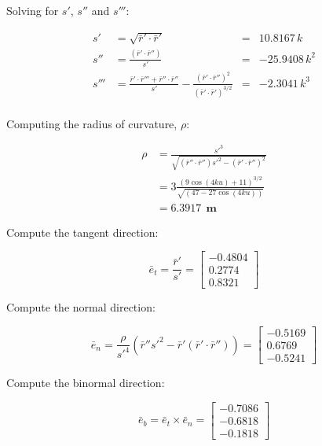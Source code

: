 \documentclass[12pt, letterpaper]{../assignment}
\begin{document}
Solving for $s'$, $s''$ and $s'''$:

\begin{equation*}
    \begin{aligned}
    {s}' &= \sqrt{\bar{r}' \cdot \bar{r}'} &= & 10.8167\,k\\
    {s}'' &= \frac{(\bar{r}' \cdot \bar{r}'')}{s'} &= & -25.9408\,k^2 \\
    {s}''' &= \frac{\bar{r}' \cdot \bar{r}'''+\bar{r}'' \cdot \bar{r}''}{s'} -
    \frac{(\bar{r}' \cdot \bar{r}'')^2}{(\bar{r}' \cdot \bar{r}')^{3/2}} &= & -2.3041\,k^3\\
    \end{aligned}
\end{equation*}

Computing the radius of curvature, $\rho$:
\begin{answer}
\begin{equation*}
    \begin{aligned}
        \rho &= \frac{{s'}^3}{\sqrt{(\bar{r}'' \cdot \bar{r}''){s'}^2 - (\bar{r}' \cdot \bar{r}'')^2}}\\
        &= 3\frac{(9\cos(4ku) + 11)^{3/2}}{\sqrt{(47 - 27\cos(4ku))}} \\
        &= 6.3917 \ \ \textbf{m}
    \end{aligned}
\end{equation*}
\end{answer}

Compute the tangent direction:
\begin{answer}
$$ \bar{e}_t = \frac{\bar{r}'}{{s'}} = 
\left[\begin{array}{r} -0.4804\\ 0.2774\\ 0.8321 \end{array}\right]$$
\end{answer}

Compute the normal direction:
\begin{answer}
$$ \bar{e}_n = \frac{\rho}{{s'}^4}\left(\bar{r}''{s'}^2 - \bar{r}' (\bar{r}' \cdot \bar{r}'')\right)
=  \left[\begin{array}{r} -0.5169\\ 0.6769\\ -0.5241 \end{array}\right]$$
\end{answer}

Compute the binormal direction:
\begin{answer}
$$ \bar{e}_b = \bar{e}_t \times \bar{e}_n = 
\left[\begin{array}{r} -0.7086\\ -0.6818\\ -0.1818 \end{array}\right]$$
\end{answer}
\end{document}
